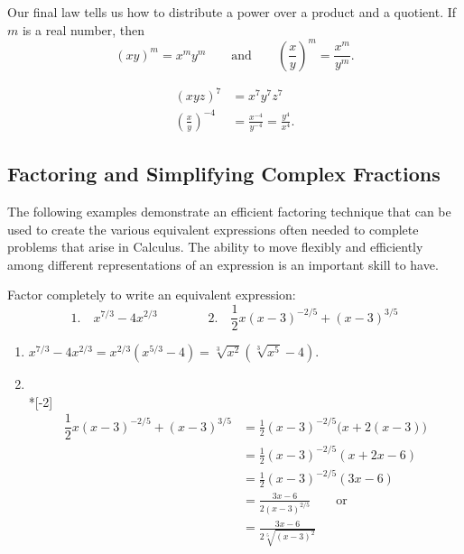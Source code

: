 Our final law tells us how to distribute a power over a product and a quotient.  If $m$ is a real number, then
\[(xy)^m = x^m y^m\qquad\text{and}\qquad\left(\frac{x}{y}\right)^m=\frac{x^m}{y^m}.\]

\begin{example}\label{prereq_exp_dist}
\vspace{-\baselineskip}
\begin{align*}
 (xyz)^7 &= x^7y^7z^7 \\
 \left(\frac{x}{y}\right)^{-4} &= \frac{x^{-4}}{y^{-4}}=\frac{y^{4}}{x^{4}}.
\end{align*}
\end{example}

\subsection{Factoring and Simplifying Complex Fractions}

The following examples demonstrate an efficient factoring technique that can be used to create the various equivalent expressions often needed to complete problems that arise in Calculus. The ability to move flexibly and efficiently a\-mong different representations of an expression is an important skill to have.

\begin{example}\label{ex_prereq_gcf}
Factor completely to write an equivalent expression:
\[
 \text{1.}\quad x^{7/3}-4x^{2/3} \qquad\qquad
 \text{2.}\quad \frac12 x(x-3)^{-2/5}+(x-3)^{3/5}
\]
\solution
\begin{enumerate}
\item\mbox{}\qquad
$x^{7/3}-4x^{2/3}=x^{2/3}(x^{5/3}-4)=\sqrt[3]{x^2}(\sqrt[3]{x^5}-4)$.\medskip
\item\mbox{}\\*[-2\baselineskip]
\begin{align*}
 \dfrac12 x(x-3)^{-2/5}+(x-3)^{3/5}
 &= \frac12 (x-3)^{-2/5}\bigl(x + 2(x -3)\bigr)\\
 &= \frac12 (x-3)^{-2/5}(x + 2x -6)\\
 &= \frac12 (x-3)^{-2/5}(3x -6) \\
 &= \frac{3x-6}{2(x-3)^{2/5}} \qquad\text{or} \\
 &= \frac{3x-6}{2\sqrt[5]{(x-3)^2}}
\end{align*}
\end{enumerate}
\end{example}


